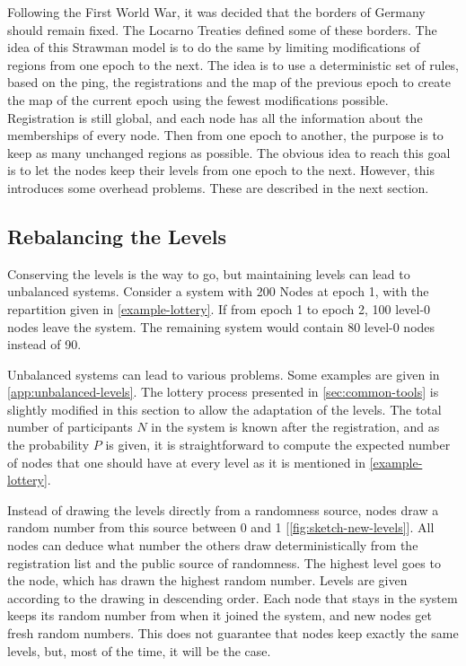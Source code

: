 \documentclass[a4paper,11pt,twoside=semi,openright]{report}
\begin{document}
Following the First World War, it was decided that the borders of Germany
should remain fixed. The Locarno Treaties defined some of these borders. The
idea of this Strawman model is to do the same by limiting modifications of
regions from one epoch to the next. The idea is to use a deterministic set of
rules, based on the ping, the registrations and the map of the previous epoch
to create the map of the current epoch using the fewest modifications possible.
Registration is still global, and each node has all the information about the
memberships of every node. Then from one epoch to another, the purpose is to
keep as many unchanged regions as possible. The obvious idea to reach this goal
is to let the nodes keep their levels from one epoch to the next. However, this
introduces some overhead problems.  These are described in the next section.

\subsection{Rebalancing the Levels} \label{rebalancing} Conserving the levels
is the way to go, but maintaining levels can lead to unbalanced systems.
Consider a system with 200 Nodes at epoch 1, with the repartition given in
\autoref{example-lottery}. If from epoch 1 to epoch 2, 100 level-0 nodes leave
the system. The remaining system would contain 80 level-0 nodes instead of 90. 

Unbalanced systems can lead to various problems. Some examples are given in
\autoref{app:unbalanced-levels}. The lottery process presented in
\autoref{sec:common-tools} is slightly modified in this section to allow the
adaptation of the levels. The total number of participants $N$ in the system is
known after the registration, and as the probability $P$ is given, it is
straightforward to compute the expected number of nodes that one should have at
every level as it is mentioned in \autoref{example-lottery}. 

Instead of drawing the levels directly from a randomness source, nodes 
draw a random number from this source between 0 and 1
[\autoref{fig:sketch-new-levels}]. All nodes can deduce what number the others
draw deterministically from the registration list and the public source of
randomness. The highest level goes to the node, which has drawn the highest
random number. Levels are given according to the drawing in descending
order. Each node that stays in the system keeps its random number from when
it joined the system, and new nodes get fresh random numbers. This does not
guarantee that nodes keep exactly the same levels, but, most of the time, it
will be the case.
\end{document}
